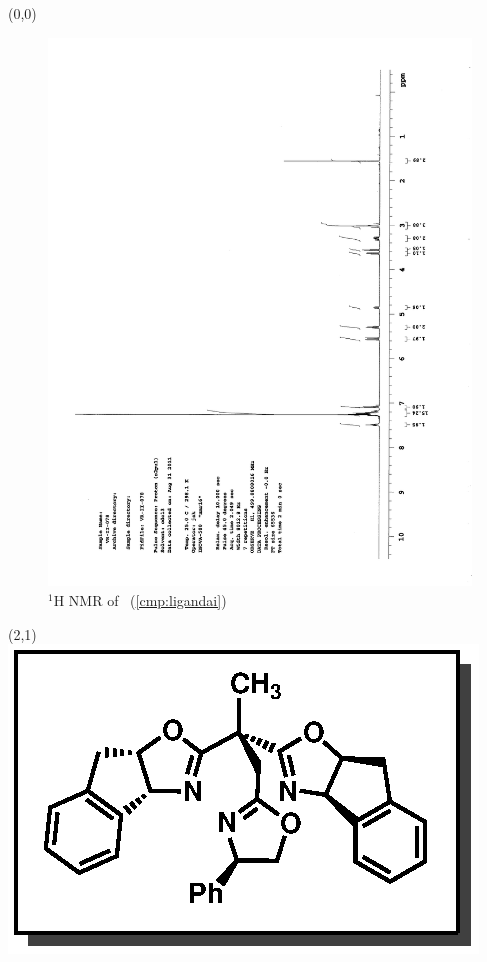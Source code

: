 \begin{textblock}{20}(0,0)
\begin{figure}[htb]
\caption{$^1$H NMR of \CMPligandai\ (\ref{cmp:ligandai})}
\includegraphics[scale=0.75, trim = 0mm 0mm 0mm 5mm,
clip]{chp_asymmetric/images/nmr/ligandaiH}
\vspace{-100pt}
\end{figure}
\end{textblock}
\begin{textblock}{1}(2,1)
\includegraphics[scale=0.8, angle=90]{chp_asymmetric/images/ligandai}
\end{textblock}
